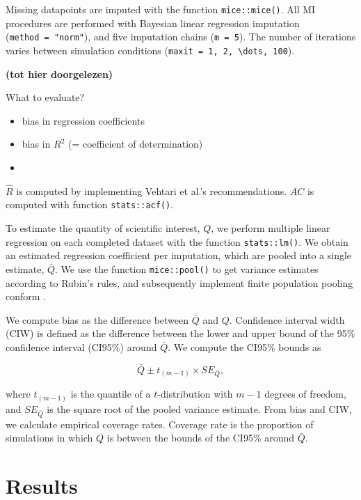 \documentclass[Royal,times,sageh]{sagej}
\begin{document}
Missing datapoints are imputed with the function \texttt{mice::mice()}.
All MI procedures are performed with Bayesian linear regression
imputation (\texttt{method\ =\ "norm"}), and five imputation chains
(\texttt{m\ =\ 5}). The number of iterations varies between simulation
conditions (\texttt{maxit\ =\ 1,\ 2,\ \textbackslash{}dots,\ 100}).

\textbf{(tot hier doorgelezen)}

What to evaluate?

\begin{itemize}
\item
  bias in regression coefficients
\item
  bias in \(R^2\) (= coefficient of determination)
\item
\end{itemize}

\(\widehat{R}\) is computed by implementing Vehtari et al.'s
\citeyearpar{veht19} recommendations. \(AC\) is computed with function
\texttt{stats::acf()}.

To estimate the quantity of scientific interest, \(Q\), we perform
multiple linear regression on each completed dataset with the function
\texttt{stats::lm()}. We obtain an estimated regression coefficient per
imputation, which are pooled into a single estimate, \(\bar{Q}\). We use
the function \texttt{mice::pool()} to get variance estimates according
to Rubin's \citeyearpar{rubin87} rules, and subsequently implement
finite population pooling conform \citet{vink14}.

We compute bias as the difference between \(\bar{Q}\) and \(Q\).
Confidence interval width (CIW) is defined as the difference between the
lower and upper bound of the 95\% confidence interval (CI95\%) around
\(\bar{Q}\). We compute the CI95\% bounds as

\[\bar{Q} \pm t_{(m-1)} \times SE_{\bar{Q}},\]

where \(t_{(m-1)}\) is the quantile of a \(t\)-distribution with \(m-1\)
degrees of freedom, and \(SE_{\bar{Q}}\) is the square root of the
pooled variance estimate. From bias and CIW, we calculate empirical
coverage rates. Coverage rate is the proportion of simulations in which
\(Q\) is between the bounds of the CI95\% around \(\bar{Q}\).

\hypertarget{results}{%
\section{Results}\label{results}}
\end{document}
